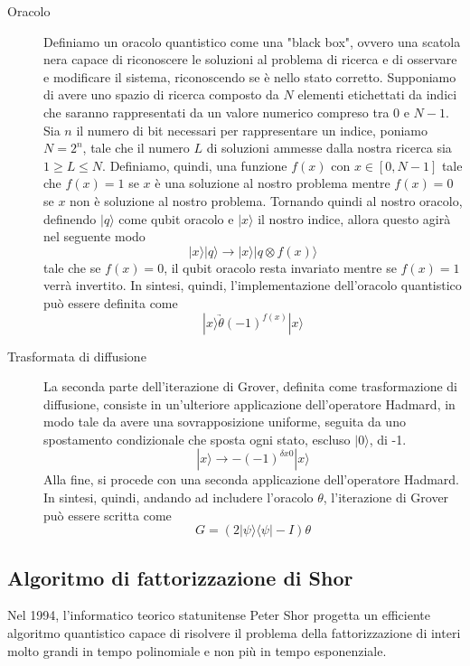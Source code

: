 \begin{description}
  \item[Oracolo] Definiamo un oracolo quantistico come una "black box", ovvero una scatola nera capace di riconoscere le soluzioni al problema di ricerca e di osservare e modificare il sistema, riconoscendo se è nello stato corretto. Supponiamo di avere uno spazio di ricerca composto da \(N\) elementi etichettati da indici che saranno rappresentati da un valore numerico compreso tra \(0\) e \(N - 1\). Sia \(n\) il numero di bit necessari per rappresentare un indice, poniamo \(N = 2^n\), tale che il numero \(L\) di soluzioni ammesse dalla nostra ricerca sia \(1 \geqslant L \leqslant N\). Definiamo, quindi, una funzione \(f(x)\) con \(x \in [0, N - 1]\) tale che \(f (x) = 1\) se \(x\) è una soluzione al nostro problema mentre \(f(x) = 0\) se \(x\) non è soluzione al nostro problema.
  Tornando quindi al nostro oracolo, definendo \(|q\rangle\) come qubit oracolo e \(|x\rangle\) il nostro indice, allora questo agirà nel seguente modo
  \[ |x\rangle |q\rangle \rightarrow |x\rangle |q \otimes f(x)\rangle \]
  tale che se \(f(x) = 0\), il qubit oracolo resta invariato mentre se \(f(x) = 1\) verrà invertito.
  In sintesi, quindi, l’implementazione dell’oracolo quantistico può essere definita come
  \[ |x\rangle \underrightarrow{\theta} (-1)^{f(x)} |x\rangle \]
  \item[Trasformata di diffusione] La seconda parte dell'iterazione di Grover, definita come trasformazione di diffusione, consiste in un'ulteriore applicazione dell'operatore Hadmard, in modo tale da avere una sovrapposizione uniforme, seguita da uno spostamento condizionale che sposta ogni stato, escluso \(|0\rangle\), di -1.
  \[ |x\rangle \rightarrow -(-1)^{\delta x 0} |x\rangle \]
  Alla fine, si procede con una seconda applicazione dell'operatore Hadmard. In sintesi, quindi, andando ad includere l'oracolo \(\theta\), l'iterazione di Grover può essere scritta come
  \[ G = (2 | \psi \rangle \langle \psi | - I) \theta \]
\end{description}

\subsection{Algoritmo di fattorizzazione di Shor}
Nel 1994, l'informatico teorico statunitense Peter Shor progetta un efficiente algoritmo quantistico capace di risolvere il problema della fattorizzazione di interi molto grandi in tempo polinomiale e non più in tempo esponenziale.


